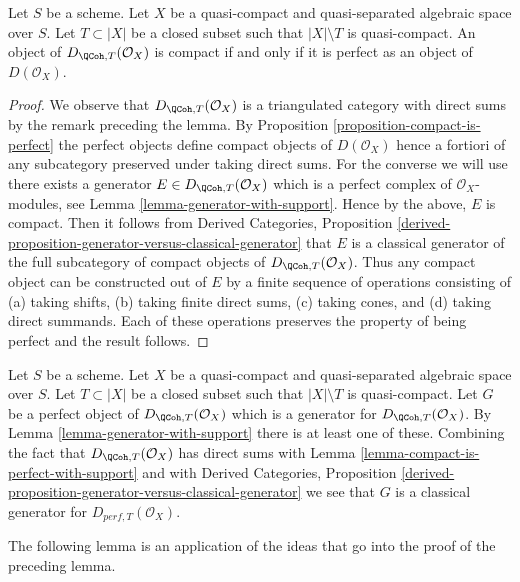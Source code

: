 \begin{lemma}
\label{lemma-compact-is-perfect-with-support}
Let $S$ be a scheme.
Let $X$ be a quasi-compact and quasi-separated algebraic space over $S$.
Let $T \subset |X|$ be a closed subset such that $|X| \setminus T$
is quasi-compact. An object of $D_{\QCoh, T}(\mathcal{O}_X)$ is compact
if and only if it is perfect as an object of $D(\mathcal{O}_X)$.
\end{lemma}

\begin{proof}
We observe that $D_{\QCoh, T}(\mathcal{O}_X)$ is a triangulated
category with direct sums by the remark preceding the lemma.
By Proposition \ref{proposition-compact-is-perfect}
the perfect objects define compact objects of $D(\mathcal{O}_X)$
hence a fortiori of any subcategory preserved under taking direct
sums. For the converse we will use there exists a generator
$E \in D_{\QCoh, T}(\mathcal{O}_X)$ which is a perfect complex
of $\mathcal{O}_X$-modules, see
Lemma \ref{lemma-generator-with-support}.
Hence by the above, $E$ is compact. Then it follows from
Derived Categories, Proposition
\ref{derived-proposition-generator-versus-classical-generator}
that $E$ is a classical generator of the full subcategory
of compact objects of $D_{\QCoh, T}(\mathcal{O}_X)$.
Thus any compact object can be constructed out of $E$ by
a finite sequence of operations consisting of
(a) taking shifts, (b) taking finite direct sums, (c) taking cones, and
(d) taking direct summands. Each of these operations preserves
the property of being perfect and the result follows.
\end{proof}

\begin{remark}
\label{remark-classical-generator-with-support}
Let $S$ be a scheme.
Let $X$ be a quasi-compact and quasi-separated algebraic space over $S$.
Let $T \subset |X|$ be a closed subset such that $|X| \setminus T$
is quasi-compact. Let $G$ be a
perfect object of $D_{\QCoh, T}(\mathcal{O}_X)$ which is a generator for
$D_{\QCoh, T}(\mathcal{O}_X)$. By Lemma \ref{lemma-generator-with-support}
there is at least one of these. Combining the fact that
$D_{\QCoh, T}(\mathcal{O}_X)$ has direct sums with
Lemma \ref{lemma-compact-is-perfect-with-support} and with
Derived Categories, Proposition
\ref{derived-proposition-generator-versus-classical-generator}
we see that $G$ is a classical generator for $D_{perf, T}(\mathcal{O}_X)$.
\end{remark}

\noindent
The following lemma is an application of the ideas that go into
the proof of the preceding lemma.

